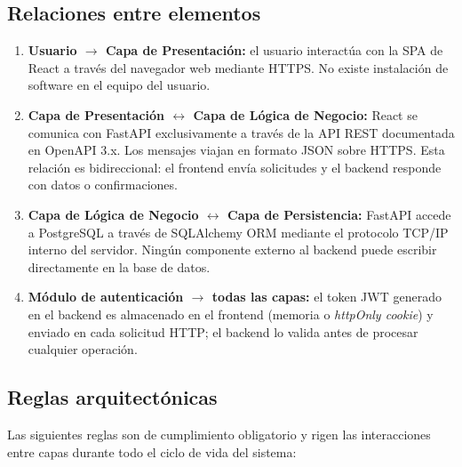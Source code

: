\subsection{Relaciones entre elementos}

\begin{enumerate}
	\item \textbf{Usuario $\to$ Capa de Presentación:} el usuario interactúa con la
	SPA de React a través del navegador web mediante HTTPS. No existe instalación
	de software en el equipo del usuario.
	
	\item \textbf{Capa de Presentación $\leftrightarrow$ Capa de Lógica de Negocio:}
	React se comunica con FastAPI exclusivamente a través de la API REST documentada
	en OpenAPI 3.x. Los mensajes viajan en formato JSON sobre HTTPS. Esta relación
	es bidireccional: el frontend envía solicitudes y el backend responde con datos
	o confirmaciones.
	
	\item \textbf{Capa de Lógica de Negocio $\leftrightarrow$ Capa de Persistencia:}
	FastAPI accede a PostgreSQL a través de SQLAlchemy ORM mediante el protocolo
	TCP/IP interno del servidor. Ningún componente externo al backend puede
	escribir directamente en la base de datos.
	
	\item \textbf{Módulo de autenticación $\to$ todas las capas:} el token JWT generado
	en el backend es almacenado en el frontend (memoria o \textit{httpOnly cookie})
	y enviado en cada solicitud HTTP; el backend lo valida antes de procesar
	cualquier operación.
\end{enumerate}

\subsection{Reglas arquitectónicas}

Las siguientes reglas son de cumplimiento obligatorio y rigen las interacciones entre
capas durante todo el ciclo de vida del sistema:

